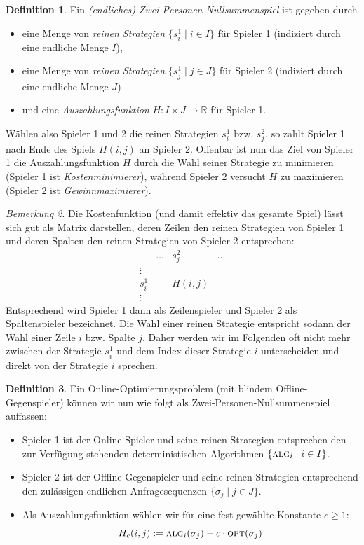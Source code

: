 \documentclass[a4paper,ngerman,12pt,bibtotoc]{scrartcl}
\theoremstyle{definition}
\newtheorem{defn}{Definition}[section]
\theoremstyle{plain}
\theoremstyle{remark}
\newtheorem{bem}[defn]{Bemerkung}
\renewcommand{\_}{\mathpunct{.}\,}
\newcommand{\?}{\,{:}\,}
\newcommand{\Alg}{\ensuremath{\textsc{alg}}}
\newcommand{\Opt}{\ensuremath{\textsc{opt}}}
\newcommand{\Hf}{H}
\newcommand{\ZPNS}{Zwei-Personen-Nullsummenspiel }
\begin{document}
	\begin{defn}
		Ein \emph{(endliches) \ZPNS} ist gegeben durch
		\begin{itemize}
			\item eine Menge von \emph{reinen Strategien} $\{s^1_i \mid i \in I\}$ für Spieler 1 (indiziert durch eine endliche Menge $I$),
			\item eine Menge von \emph{reinen Strategien} $\{s^1_j \mid j \in J\}$ für Spieler 2 (indiziert durch eine endliche Menge $J$)
			\item und eine \emph{Auszahlungsfunktion} $\Hf: I \times J \to \mathbb{R}$ für Spieler 1.
		\end{itemize}
		Wählen also Spieler 1 und 2 die reinen Strategien $s^1_i$ bzw. $s^2_j$, so zahlt Spieler 1 nach Ende des Spiels $\Hf(i,j)$ an Spieler 2. Offenbar ist nun das Ziel von Spieler 1 die Auszahlungsfunktion $\Hf$ durch die Wahl seiner Strategie zu minimieren (Spieler 1 ist \emph{Kostenminimierer}), während Spieler 2 versucht $\Hf$ zu maximieren (Spieler 2 ist \emph{Gewinnmaximierer}).
	\end{defn}
	
	\begin{bem}
		Die Kostenfunktion (und damit effektiv das gesamte Spiel) lässt sich gut als Matrix darstellen, deren Zeilen den reinen Strategien von Spieler 1 und deren Spalten den reinen Strategien von Spieler 2 entsprechen:
		\[\begin{array}{l||c|c|c}
					& \dots & s^2_j	& \dots \\\hline\hline
			 \vdots & 		&		&		\\\hline
			 s^1_i	&		&\Hf(i,j)&		\\\hline
			 \vdots &		&		&			
		\end{array}\]
		Entsprechend wird Spieler 1 dann als \glqq Zeilenspieler\grqq{} und Spieler 2 als \glqq Spaltenspieler\grqq{} bezeichnet. Die Wahl einer reinen Strategie entspricht sodann der Wahl einer Zeile $i$ bzw. Spalte $j$. Daher werden wir im Folgenden oft nicht mehr zwischen der Strategie $s^1_i$ und dem Index dieser Strategie $i$ unterscheiden und direkt von der \glqq Strategie $i$\grqq{} sprechen.
	\end{bem}	

	\begin{defn}
		Ein Online-Optimierungsproblem (mit blindem Offline-Gegenspieler) können wir nun wie folgt als \ZPNS auffassen:
		\begin{itemize}
			\item Spieler 1 ist der Online-Spieler und seine reinen Strategien entsprechen den zur Verfügung stehenden deterministischen Algorithmen $\{\Alg_i \mid i \in I\}$.
			\item Spieler 2 ist der Offline-Gegenspieler und seine reinen Strategien entsprechend den zulässigen endlichen Anfragesequenzen $\{\sigma_j \mid j \in J\}$.
			\item Als Auszahlungsfunktion wählen wir für eine fest gewählte Konstante $c \geq 1$:
			\[\Hf_c(i,j) := \Alg_i(\sigma_j) - c\cdot\Opt(\sigma_j)\]
		\end{itemize}
	\end{defn}
	
\end{document}
